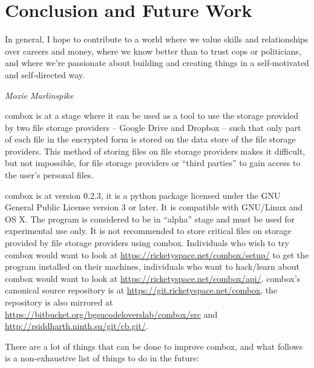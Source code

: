 \chapter{Conclusion and Future Work}\label{ch:5}

\epigraph{In general, I hope to contribute to a world where we value
  skills and relationships over careers and money, where we know
  better than to trust cops or politicians, and where we're passionate
  about building and creating things in a self-motivated and
  self-directed way.}{\textit{Moxie Marlinspike}}

combox is at a stage where it can be used as a tool to use the storage
provided by two file storage providers -- Google Drive and Dropbox --
such that only part of each file in the encrypted form is stored on
the data store of the file storage providers. This method of storing
files on file storage providers makes it difficult, but not
impossible, for file storage providers or ``third parties'' to gain
access to the user's personal files.

combox is at version 0.2.3, it is a python package licensed under the
GNU General Public License version 3 or later. It is compatible with
GNU/Linux and OS X. The program is considered to be in ``alpha'' stage
and must be used for experimental use only. It is not recommended to
store critical files on storage provided by file storage providers
using combox. Individuals who wish to try combox would want to look at
\url{https://ricketyspace.net/combox/setup/} to get the program
installed on their machines, individuals who want to hack/learn about
combox would want to look at
\url{https://ricketyspace.net/combox/api/}. combox's canonical source
repository is at \url{https://git.ricketyspace.net/combox}, the
repository is also mirrored at
\url{https://bitbucket.org/bgsucodeloverslab/combox/src} and
\url{http://rsiddharth.ninth.su/git/cb.git/}.

There are a lot of things that can be done to improve combox, and what
follows is a non-exhaustive list of things to do in the future:

